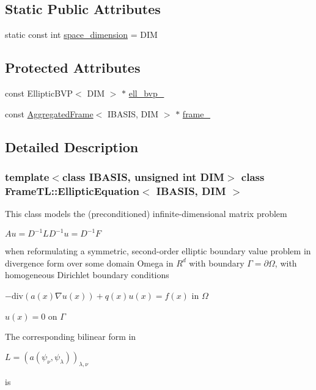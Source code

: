 \subsection*{Static Public Attributes}
\begin{CompactItemize}
\item 
static const int \hyperlink{classFrameTL_1_1EllipticEquation_db618d3531a93bc69d8181064705e6a9}{space\_\-dimension} = DIM
\end{CompactItemize}
\subsection*{Protected Attributes}
\begin{CompactItemize}
\item 
const EllipticBVP$<$ DIM $>$ $\ast$ \hyperlink{classFrameTL_1_1EllipticEquation_998a091c1b338f3af2ca837a5f92cdc6}{ell\_\-bvp\_\-}
\item 
const \hyperlink{classFrameTL_1_1AggregatedFrame}{AggregatedFrame}$<$ IBASIS, DIM $>$ $\ast$ \hyperlink{classFrameTL_1_1EllipticEquation_c6cfc9f98e124563a81a3e1da08de95e}{frame\_\-}
\end{CompactItemize}


\subsection{Detailed Description}
\subsubsection*{template$<$class IBASIS, unsigned int DIM$>$ class FrameTL::EllipticEquation$<$ IBASIS, DIM $>$}

This class models the (preconditioned) infinite-dimensional matrix problem

$Au = D^{-1}LD^{-1}u = D^{-1}F$

when reformulating a symmetric, second-order elliptic boundary value problem in divergence form over some domain Omega in $R^d$ with boundary $\Gamma=\partial \Omega$, with homogeneous Dirichlet boundary conditions

$-\mbox{div}(a(x)\nabla u(x)) + q(x)u(x) = f(x)$ in $\Omega$\par
 $u(x) = 0$ on $\Gamma$\par


The corresponding bilinear form in

$L = (a(\psi_\nu,\psi_\lambda))_{\lambda,\nu}$

is

